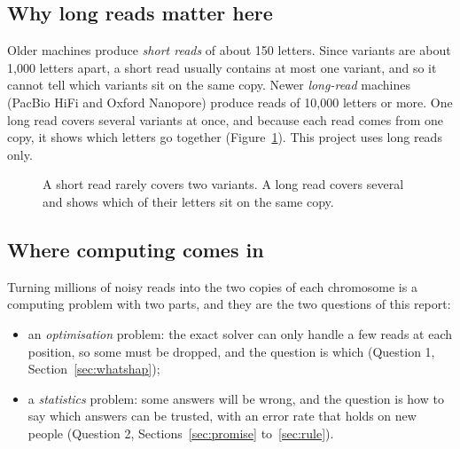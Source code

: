 \documentclass[11pt]{article}
\begin{document}
\subsection{Why long reads matter here}

Older machines produce \emph{short reads} of about 150 letters. Since
variants are about 1{,}000 letters apart, a short read usually contains at
most one variant, and so it cannot tell which variants sit on the same copy.
Newer \emph{long-read} machines (PacBio HiFi and Oxford Nanopore) produce
reads of 10{,}000 letters or more. One long read covers several variants
at once, and because each read comes from one copy, it shows which letters
go together (Figure~\ref{fig:longreads}). This project uses long reads only.

\begin{figure}[h]
\centering
{}
\caption{A short read rarely covers two variants. A long read covers several
and shows which of their letters sit on the same copy.}
\label{fig:longreads}
\end{figure}

\subsection{Where computing comes in}

Turning millions of noisy reads into the two copies of each chromosome is a
computing problem with two parts, and they are the two questions of this
report:
\begin{itemize}
\item an \emph{optimisation} problem: the exact solver can only handle a few
  reads at each position, so some must be dropped, and the question is
  which (Question 1, Section~\ref{sec:whatshap});
\item a \emph{statistics} problem: some answers will be wrong, and the
  question is how to say which answers can be trusted, with an error rate
  that holds on new people (Question 2, Sections~\ref{sec:promise}
  to~\ref{sec:rule}).
\end{itemize}
\end{document}
